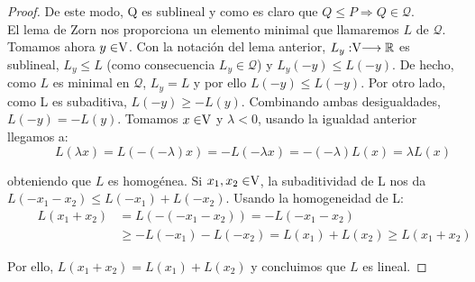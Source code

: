 \begin{proof}
		De este modo, Q es sublineal y como es claro que $ Q \leq P \Longrightarrow Q \in \mathcal{Q}$. \\
		
		El lema de Zorn nos proporciona un elemento minimal que llamaremos $ L $ de $ \mathcal{Q} $. Tomamos ahora $ y \in \vecSpace $. Con la notación del lema anterior, $ L_y : \vecSpace \longrightarrow \RR $ es sublineal, $ L_y \leq L $ (como consecuencia $ L_y \in \mathcal{Q} $) y $ L_y (-y) \leq L(-y) $. De hecho, como $ L $ es minimal en $ \mathcal{Q} $, $ L_y = L $ y por ello $ L (-y) \leq L(-y) $. Por otro lado, como L es subaditiva, $ L(-y) \geq -L(y) $. Combinando ambas desigualdades, $ L(-y) = -L(y) $. Tomamos $ x \in \vecSpace $ y $ \lambda < 0 $, usando la igualdad anterior llegamos a:
		\[ \qquad \quad
		L(\lambda x) = L (-(-\lambda)x) = -L(-\lambda x) = -(-\lambda)L(x) = \lambda L(x) \label{1}
		\] 
		
		obteniendo que $ L $ es homogénea. Si $ x_1, x_2 \in \vecSpace $, la subaditividad de L nos da $ L(-x_1-x_2) \leq L(-x_1) + L(-x_2) $. Usando la homogeneidad de L:
		\begin{equation*}
		\begin{split} \qquad
		L(x_1+x_2) &= L(-(-x_1-x_2)) = -L(-x_1-x_2) \\ 
		& \geq -L(-x_1)-L(-x_2) = L(x_1) + L (x_2) \geq L(x_1+x_2) 
		\end{split}
		\end{equation*}
		
		Por ello, $	L(x_1+x_2) = L(x_1) + L (x_2) $ y concluimos que $ L $ es lineal.
		
	\end{proof}
	
